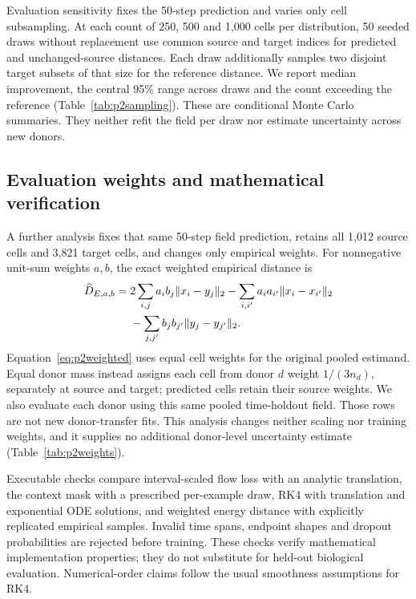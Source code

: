 \documentclass[10pt,a4paper]{article}
\begin{document}
Evaluation sensitivity fixes the 50-step prediction and varies only cell subsampling. At each count of 250, 500 and 1,000 cells per distribution, 50 seeded draws without replacement use common source and target indices for predicted and unchanged-source distances. Each draw additionally samples two disjoint target subsets of that size for the reference distance. We report median improvement, the central 95\% range across draws and the count exceeding the reference (Table~\ref{tab:p2sampling}). These are conditional Monte Carlo summaries. They neither refit the field per draw nor estimate uncertainty across new donors.

\subsection{Evaluation weights and mathematical verification}
A further analysis fixes that same 50-step field prediction, retains all 1,012 source cells and 3,821 target cells, and changes only empirical weights. For nonnegative unit-sum weights $a,b$, the exact weighted empirical distance is
\begin{align}
\widehat D_{E,a,b}={}&2\sum_{i,j}a_i b_j\|x_i-y_j\|_2
-\sum_{i,i'}a_i a_{i'}\|x_i-x_{i'}\|_2\notag\\
&-\sum_{j,j'}b_jb_{j'}\|y_j-y_{j'}\|_2.\label{eq:p2weighted}
\end{align}
Equation~\eqref{eq:p2weighted} uses equal cell weights for the original pooled estimand. Equal donor mass instead assigns each cell from donor $d$ weight $1/(3n_d)$, separately at source and target; predicted cells retain their source weights. We also evaluate each donor using this same pooled time-holdout field. Those rows are not new donor-transfer fits. This analysis changes neither scaling nor training weights, and it supplies no additional donor-level uncertainty estimate (Table~\ref{tab:p2weights}).

Executable checks compare interval-scaled flow loss with an analytic translation, the context mask with a prescribed per-example draw, RK4 with translation and exponential ODE solutions, and weighted energy distance with explicitly replicated empirical samples. Invalid time spans, endpoint shapes and dropout probabilities are rejected before training. These checks verify mathematical implementation properties; they do not substitute for held-out biological evaluation. Numerical-order claims follow the usual smoothness assumptions for RK4.
\end{document}
